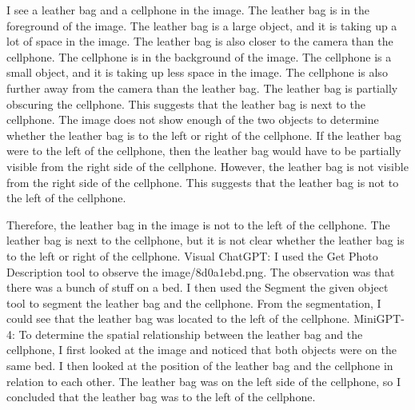 \begin{enumerate}
    I see a leather bag and a cellphone in the image.
    The leather bag is in the foreground of the image. The leather bag is a large object, and it is taking up a lot of space in the image. The leather bag is also closer to the camera than the cellphone.
    The cellphone is in the background of the image. The cellphone is a small object, and it is taking up less space in the image. The cellphone is also further away from the camera than the leather bag.
    The leather bag is partially obscuring the cellphone. This suggests that the leather bag is next to the cellphone.
    The image does not show enough of the two objects to determine whether the leather bag is to the left or right of the cellphone.
    If the leather bag were to the left of the cellphone, then the leather bag would have to be partially visible from the right side of the cellphone. However, the leather bag is not visible from the right side of the cellphone. This suggests that the leather bag is not to the left of the cellphone.
    
    Therefore, the leather bag in the image is not to the left of the cellphone. The leather bag is next to the cellphone, but it is not clear whether the leather bag is to the left or right of the cellphone.   
    \subitem Visual ChatGPT: I used the Get Photo Description tool to observe the image/8d0a1ebd.png. The observation was that there was a bunch of stuff on a bed. I then used the Segment the given object tool to segment the leather bag and the cellphone. From the segmentation, I could see that the leather bag was located to the left of the cellphone.
    \subitem MiniGPT-4: To determine the spatial relationship between the leather bag and the cellphone, I first looked at the image and noticed that both objects were on the same bed. I then looked at the position of the leather bag and the cellphone in relation to each other. The leather bag was on the left side of the cellphone, so I concluded that the leather bag was to the left of the cellphone. 
\end{enumerate}
